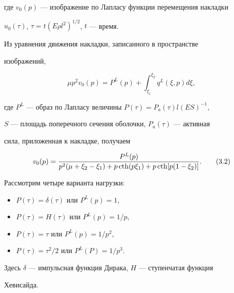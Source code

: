 где $v_{0}(p)$ --- изображение по Лапласу функции перемещения накладки


$u_{0}(\tau)$, $\tau=t(E\rho l^{2})^{1/2}$, $t$ --- время.


Из уравнения движения накладки, записанного в пространстве


изображений,


$$


\mu p^{2}v_{0}(p)=P^{L}(p)+\int_{\xi_{1}}^{\xi_{2}}


q^{L}(\xi,p)d\xi,


$$


где $P^L$ --- образ по Лапласу величины $P(\tau)=P_{a}(\tau)l(ES)^{-1}$,


$S$ --- площадь поперечного сечения оболочки, $P_{a}(\tau)$ --- активная


сила, приложенная к накладке, получаем


\begin{equation}


v_{0}(p)=\frac{P^{L}(p)}{p^{2}(\mu+\xi_{2}-\xi_{1})+


p \cth(p\xi_{1})+p \cth[p(1-\xi_{2})]}.


\tag{3.2}


\end{equation}





Рассмотрим четыре варианта нагрузки:


\pagebreak




\begin{itemize}


\item[1.] $P(\tau)=\delta(\tau)$ или $P^{L}(p)=1$,


\item[2.] $P(\tau)=H(\tau)$ или $P^{L}(p)=1/p$,


\item[3.] $P(\tau)=\tau$ или $P^{L}(p)=1/p^{2}$,


\item[4.] $P(\tau)=\tau^{2}/2$ или $P^{L}(P)=1/p^{3}$.


\end{itemize}


Здесь $\delta$ --- импульсная функция Дирака, $H$ --- ступенчатая функция


Хевисайда.





